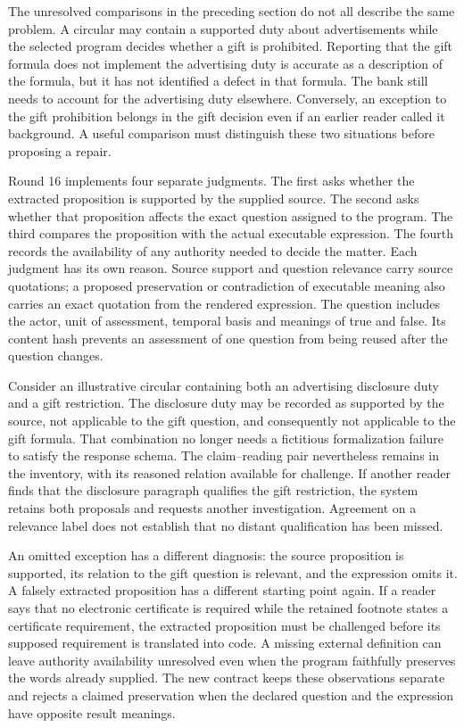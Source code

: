 \documentclass[12pt,a4paper,oneside,openany]{book}
\begin{document}
The unresolved comparisons in the preceding section do not all describe the
same problem. A circular may contain a supported duty about advertisements
while the selected program decides whether a gift is prohibited. Reporting
that the gift formula does not implement the advertising duty is accurate as a
description of the formula, but it has not identified a defect in that formula.
The bank still needs to account for the advertising duty elsewhere. Conversely,
an exception to the gift prohibition belongs in the gift decision even if an
earlier reader called it background. A useful comparison must distinguish
these two situations before proposing a repair.

Round 16 implements four separate judgments. The first asks whether the
extracted proposition is supported by the supplied source. The second asks
whether that proposition affects the exact question assigned to the program.
The third compares the proposition with the actual executable expression. The
fourth records the availability of any authority needed to decide the matter.
Each judgment has its own reason. Source support and question relevance carry
source quotations; a proposed preservation or contradiction of executable
meaning also carries an exact quotation from the rendered expression. The
question includes the actor, unit of assessment, temporal basis and meanings
of true and false. Its content hash prevents an assessment of one question
from being reused after the question changes.

Consider an illustrative circular containing both an advertising disclosure
duty and a gift restriction. The disclosure duty may be recorded as supported
by the source, not applicable to the gift question, and consequently not
applicable to the gift formula. That combination no longer needs a fictitious
formalization failure to satisfy the response schema. The claim--reading pair
nevertheless remains in the inventory, with its reasoned relation available for
challenge. If another reader finds that the disclosure paragraph qualifies the
gift restriction, the system retains both proposals and requests another
investigation. Agreement on a relevance label does not establish that no
distant qualification has been missed.

An omitted exception has a different diagnosis: the source proposition is
supported, its relation to the gift question is relevant, and the expression
omits it. A falsely extracted proposition has a different starting point again.
If a reader says that no electronic certificate is required while the retained
footnote states a certificate requirement, the extracted proposition must be
challenged before its supposed requirement is translated into code. A missing
external definition can leave authority availability unresolved even when the
program faithfully preserves the words already supplied. The new contract
keeps these observations separate and rejects a claimed preservation when the
declared question and the expression have opposite result meanings.
\end{document}
